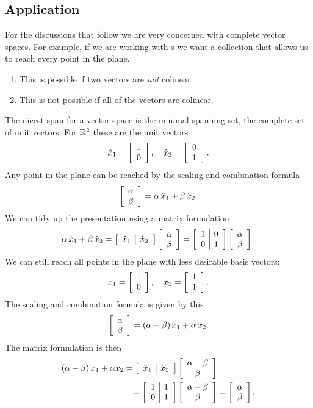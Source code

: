 \subsection{Application}
For the discussions that follow we are very concerned with complete vector spaces. For example, if we are working with \vv s we want a collection that allows us to reach every point in the plane.
\begin{enumerate}
\item This is possible if two vectors are \textit{not} colinear.
\item This is not possible if all of the vectors are colinear.
\end{enumerate}

The nicest span for a vector space is the minimal spanning set, the complete set of unit vectors. For $\real{2}$ these are the unit vectors
\begin{equation}
  \hat{x}_{1}=\mat{c}{1\\0}, \quad \hat{x}_{2}=\mat{c}{0\\1}.
\end{equation}
Any point in the plane can be reached by the scaling and combination formula
\begin{equation}
  \mat{c}{\alpha \\ \beta} = \alpha \,\hat{x}_{1} + \beta \, \hat{x}_{2}.
\end{equation}
We can tidy up the presentation using a matrix formulation
\begin{equation}
  \alpha \, \hat{x}_{1} +  \beta \, \hat{x}_{2} = \mat{c|c}{\hat{x}_{1} & \hat{x}_{2}}\mat{c}{\alpha \\ \beta} = \mat{c|c}{1&0\\0&1} \mat{c}{\alpha \\ \beta}.
\end{equation}
We can still reach all points in the plane with less desirable basis vectors:
\begin{equation}
  x_{1}=\mat{c}{1\\0}, \quad x_{2}=\mat{c}{1\\1}.
\end{equation}
The scaling and combination formula is given by this
\begin{equation}
  \mat{c}{\alpha \\ \beta} = \paren{\alpha - \beta}  x_{1} + \alpha\,x_{2}.
\end{equation}
The matrix formulation is then
\begin{equation}
\begin{split}
  \paren{\alpha - \beta} x_{1} + \alpha x_{2} = \mat{c|c}{\hat{x}_{1} & \hat{x}_{2}}&\mat{c}{\alpha - \beta \\ \beta} \\
  = \mat{c|c}{1&1\\0&1}&\mat{c}{\alpha - \beta \\ \beta} = \mat{c}{\alpha \\ \beta}.
\end{split}
\end{equation}
